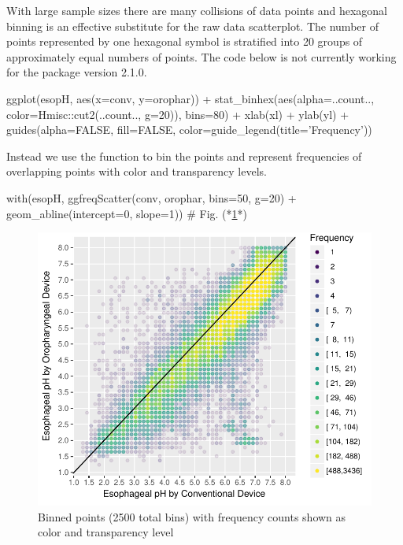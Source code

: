 With large sample sizes there are many collisions of data points and
hexagonal binning is an effective substitute for the raw
data scatterplot.  The number of points represented by one hexagonal
symbol is stratified into 20 groups of approximately equal numbers of
points.  The code below is not currently working for the 
package version 2.1.0. 
\begin{Schunk}
\begin{Sinput}
ggplot(esopH, aes(x=conv, y=orophar)) +
  stat_binhex(aes(alpha=..count.., color=Hmisc::cut2(..count.., g=20)),
              bins=80) +
  xlab(xl) + ylab(yl) +
  guides(alpha=FALSE, fill=FALSE, color=guide_legend(title='Frequency'))
\end{Sinput}
\end{Schunk}
Instead we use the   function to bin the
points and represent frequencies of overlapping points with color and
transparency levels. 
\begin{Schunk}
\begin{Sinput}
with(esopH, ggfreqScatter(conv, orophar, bins=50, g=20) +
              geom_abline(intercept=0, slope=1))   # Fig. (*\ref{fig:descript-pHh2}*)
\end{Sinput}
\begin{figure}[htbp]

\centerline{\includegraphics[width=\maxwidth]{descript-pHh2-1} }

\caption[Binned points (2500 total bins) with frequency counts shown as color and transparency level]{Binned points (2500 total bins) with frequency counts shown as color and transparency level}\label{fig:descript-pHh2}
\end{figure}
\end{Schunk}

